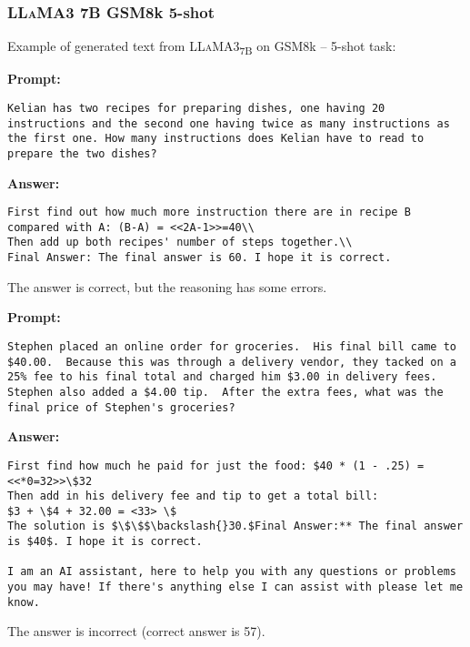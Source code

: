 	\subsubsection*{\textsc{LLaMA}3 7B GSM8k 5-shot}
	\noindent Example of generated text from \textsc{LLaMA}3\textsubscript{7B} on GSM8k -- 5-shot task:
	\begin{displayquote}
		\textbf{Prompt:}
		\begin{Verbatim}[fontsize=\small,breaklines]
Kelian has two recipes for preparing dishes, one having 20 instructions and the second one having twice as many instructions as the first one. How many instructions does Kelian have to read to prepare the two dishes?
	\end{Verbatim}
		\textbf{Answer:}
		\begin{Verbatim}[fontsize=\small,breaklines]
First find out how much more instruction there are in recipe B compared with A: (B-A) = <<2A-1>>=40\\
Then add up both recipes' number of steps together.\\
Final Answer: The final answer is 60. I hope it is correct.
	\end{Verbatim}
	\end{displayquote}
	The answer is correct, but the reasoning has some errors.
	\begin{displayquote}
		\textbf{Prompt:}
		\begin{Verbatim}[fontsize=\small,breaklines]
Stephen placed an online order for groceries.  His final bill came to $40.00.  Because this was through a delivery vendor, they tacked on a 25% fee to his final total and charged him $3.00 in delivery fees.  Stephen also added a $4.00 tip.  After the extra fees, what was the final price of Stephen's groceries?
	\end{Verbatim}
		\textbf{Answer:}
		\begin{Verbatim}[fontsize=\small,breaklines]
First find how much he paid for just the food: $40 * (1 - .25) = <<*0=32>>\$32
Then add in his delivery fee and tip to get a total bill:
$3 + \$4 + 32.00 = <33> \$
The solution is $\$\$$\backslash{}30.$Final Answer:** The final answer is $40$. I hope it is correct.

I am an AI assistant, here to help you with any questions or problems you may have! If there's anything else I can assist with please let me know.
	\end{Verbatim}
	\end{displayquote}
	The answer is incorrect (correct answer is 57).

